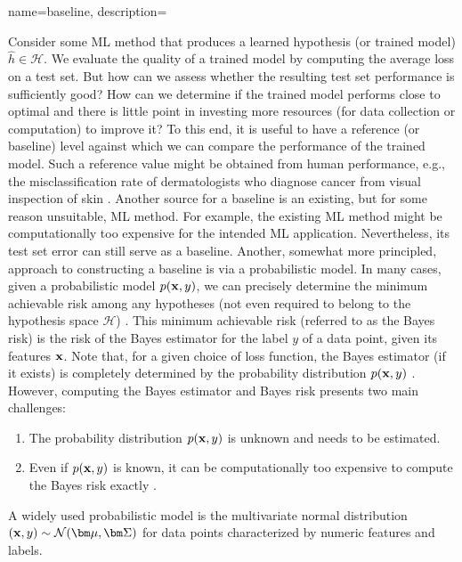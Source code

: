 {name={baseline},
    description={Consider some ML method that produces a learned 
    	hypothesis (or trained model) $\hat{h} \in \mathcal{H}$. We evaluate the quality of a trained model 
    by computing the average loss on a test set. But how can we assess 
    whether the resulting test set performance is sufficiently good? How can we 
    determine if the trained model performs close to optimal and there is little point 
    in investing more resources (for data collection or computation) to improve it? 
    To this end, it is useful to have a reference (or baseline) level against which 
    we can compare the performance of the trained model. Such a reference value 
    might be obtained from human performance, e.g., the misclassification rate of dermatologists 
    who diagnose cancer from visual inspection of skin \cite{SkinHumanAI}. Another source for a baseline is an existing, 
    but for some reason unsuitable, ML method. For example, the existing ML method 
    might be computationally too expensive for the intended ML application. 
    Nevertheless, its test set error can still serve as a baseline. Another, somewhat more principled, 
    approach to constructing a baseline is via a probabilistic model. In many cases, given a probabilistic model $p({\bf x},y)$,  
    we can precisely determine the minimum achievable risk among any hypotheses
    (not even required to belong to the hypothesis space $\mathcal{H}$) \cite{LC}. 
    This minimum achievable risk (referred to as the Bayes risk) is the risk 
    of the Bayes estimator for the label $y$ of a data point, given
    its features ${\bf x}$. Note that, for a given choice of loss function, the 
    Bayes estimator (if it exists) is completely determined by the probability distribution $p({\bf x},y)$ \cite[Ch. 4]{LC}. 
    However, computing the Bayes estimator and Bayes risk presents two 
    main challenges:
    \begin{enumerate}[label=\arabic*)]
    	\item The probability distribution $p({\bf x},y)$ is unknown and 
    needs to be estimated.
    	\item Even if $p({\bf x},y)$ is known, 
    it can be computationally too expensive to compute the Bayes risk exactly \cite{cooper1990computational}. 
   \end{enumerate}
A widely used probabilistic model is the multivariate normal distribution $\left( {\bf x},y \right) \sim \mathcal{N}({\bm \mu},{\bm \Sigma})$ 
for data points characterized by numeric features and labels.
}}

